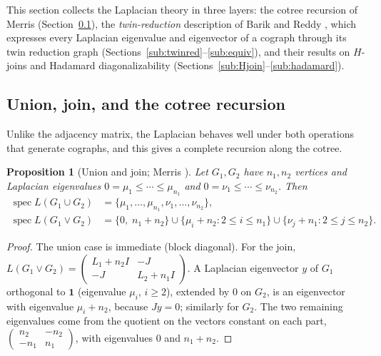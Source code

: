 \documentclass[11pt]{article}
\theoremstyle{plain}
\newtheorem{proposition}[theorem]{Proposition}
\theoremstyle{definition}
\theoremstyle{remark}
\DeclareMathOperator{\spec}{spec}
\begin{document}
	
	\medskip
	This section collects the Laplacian theory in three layers: the cotree recursion of Merris (Section~\ref{sub:Ljoin}), the \emph{twin-reduction} description of Barik and Reddy \cite{BarikReddy2023}, which expresses every Laplacian eigenvalue and eigenvector of a cograph through its twin reduction graph (Sections~\ref{sub:twinred}--\ref{sub:equiv}), and their results on $H$-joins and Hadamard diagonalizability (Sections~\ref{sub:Hjoin}--\ref{sub:hadamard}).
	
	\subsection{Union, join, and the cotree recursion}
	\label{sub:Ljoin}
	
	Unlike the adjacency matrix, the Laplacian behaves well under both operations that generate cographs, and this gives a complete recursion along the cotree.
	
	\begin{proposition}[Union and join; Merris \cite{Merris1994}]
		\label{prop:Ljoin}
		Let $G_1,G_2$ have $n_1,n_2$ vertices and Laplacian eigenvalues $0=\mu_1\le\cdots\le\mu_{n_1}$ and $0=\nu_1\le\cdots\le\nu_{n_2}$. Then
		\begin{align*}
			\spec L(G_1\cup G_2)&=\{\mu_1,\ldots,\mu_{n_1},\nu_1,\ldots,\nu_{n_2}\},\\
			\spec L(G_1\vee G_2)&=\{0,\;n_1+n_2\}\cup\{\mu_i+n_2:2\le i\le n_1\}\cup\{\nu_j+n_1:2\le j\le n_2\}.
		\end{align*}
	\end{proposition}
	\begin{proof}
		The union case is immediate (block diagonal). For the join, $L(G_1\vee G_2)=\begin{pmatrix}L_1+n_2I&-J\\-J&L_2+n_1I\end{pmatrix}$. A Laplacian eigenvector $y$ of $G_1$ orthogonal to $\mathbf1$ (eigenvalue $\mu_i$, $i\ge2$), extended by $0$ on $G_2$, is an eigenvector with eigenvalue $\mu_i+n_2$, because $Jy=0$; similarly for $G_2$. The two remaining eigenvalues come from the quotient on the vectors constant on each part, $\begin{pmatrix}n_2&-n_2\\-n_1&n_1\end{pmatrix}$, with eigenvalues $0$ and $n_1+n_2$. \qedhere
	\end{proof}
	
\end{document}

